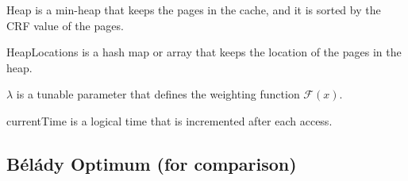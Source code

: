 Heap is a min-heap that keeps the pages in the cache, and it is sorted by the CRF value of the pages.

HeapLocations is a hash map or array that keeps the location of the pages in the heap.

$\lambda$ is a tunable parameter that defines the weighting function $\mathcal{F}(x)$.

currentTime is a logical time that is incremented after each access.

\subsection{Bélády Optimum (for comparison)}